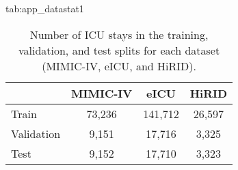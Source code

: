 \begin{table}[h]
\floatconts
    {tab:app_datastat1}
    {\caption{Number of ICU stays in the training, validation, and test splits for each dataset (MIMIC-IV, eICU, and HiRID).}}
    {
        \begin{tabular}{lccc}
            \toprule
             & MIMIC-IV & eICU & HiRID \\
            \midrule
            Train & 73,236 & 141,712 & 26,597 \\
            Validation & 9,151 & 17,716 & 3,325 \\
            Test & 9,152 & 17,710 & 3,323 \\
            \bottomrule        
        \end{tabular}
    }
\end{table}